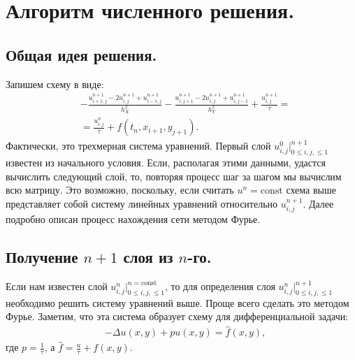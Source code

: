 \documentclass[14pt,a4paper]{extarticle}
\newcommand{\1}{\mathbbm{1}}
\begin{document}
\section{Алгоритм численного решения.}
\subsection{Общая идея решения.}
Запишем схему в виде:
\begin{align*} 
    &- \frac{u_{i+1, j}^{n+1} - 2 u_{i, j}^{n+1} + u_{i-1, j}^{n+1}}{h_X^2} - \frac{u_{i, j+1}^{n+1} - 2 u_{i, j}^{n+1} + u_{i, j-1}^{n+1}}{h_Y^2} + \frac{u_{i, j}^{n+1}}{\tau} = \\&= 
    \frac{u_{i, j}^n}{\tau} + f(t_{n}, x_{i+1}, y_{j+1}).
\end{align*}
Фактически, это трехмерная система уравнений. Первый слой $u_{i, j}^{0} \big|^{n+1} _{0 \leq i, j, \leq 1}$ 
известен из начального условия. Если, располагая этими данными, удастся вычислить следующий слой, то, повторяя процесс шаг за шагом мы вычислим всю матрицу. Это возможно, поскольку, если считать $u^{n} =\text{const}$ схема выше представляет собой систему линейных уравнений относительно $u_{i, j}^{n+1}$. 
Далее подробно описан процесс нахождения сети методом Фурье.
\subsection{Получение $n + 1$ слоя из $n$-го.}
Если нам известен слой $u_{i, j}^{n} \big|^{n = \text{const}} _{0 \leq i, j, \leq 1}$, то для определения слоя $u_{i, j}^{n} \big|^{n+1} _{0 \leq i, j, \leq 1}$ необходимо решить систему уравнений выше. Проще всего сделать это методом Фурье. Заметим, что эта система образует схему для дифференциальной задачи:
\begin{align*} 
    & - \Delta u(x, y) + p u(x , y) = \hat f(x, y), 
\end{align*}
где $p = \frac{1}{\tau}$, а $\hat f = \frac{u}{\tau} + f(x, y)$.
\end{document}
